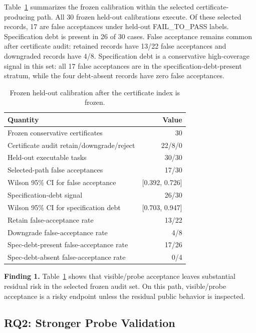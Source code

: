 \documentclass[conference]{IEEEtran}
\begin{document}
Table~\ref{tab:heldout} summarizes the frozen calibration within the selected certificate-producing path.
All 30 frozen held-out calibrations execute.
Of these selected records, 17 are false acceptances under held-out FAIL\_TO\_PASS labels.
Specification debt is present in 26 of 30 cases.
False acceptance remains common after certificate audit: retained records have 13/22 false acceptances and downgraded records have 4/8.
Specification debt is a conservative high-coverage signal in this set: all 17 false acceptances are in the specification-debt-present stratum, while the four debt-absent records have zero false acceptances.

\begin{table}[t]
\caption{Frozen held-out calibration after the certificate index is frozen.}
\label{tab:heldout}
\centering
\begin{tabular}{lr}
\toprule
Quantity & Value \\
\midrule
Frozen conservative certificates & 30 \\
Certificate audit retain/downgrade/reject & 22/8/0 \\
Held-out executable tasks & 30/30 \\
Selected-path false acceptances & 17/30 \\
Wilson 95\% CI for false acceptance & [0.392, 0.726] \\
Specification-debt signal & 26/30 \\
Wilson 95\% CI for specification debt & [0.703, 0.947] \\
\midrule
Retain false-acceptance rate & 13/22 \\
Downgrade false-acceptance rate & 4/8 \\
Spec-debt-present false-acceptance rate & 17/26 \\
Spec-debt-absent false-acceptance rate & 0/4 \\
\bottomrule
\end{tabular}
\end{table}

\noindent\textbf{Finding 1.}
Table~\ref{tab:heldout} shows that visible/probe acceptance leaves substantial residual risk in the selected frozen audit set.
On this path, visible/probe acceptance is a risky endpoint unless the residual public behavior is inspected.

\subsection{RQ2: Stronger Probe Validation}
\end{document}
